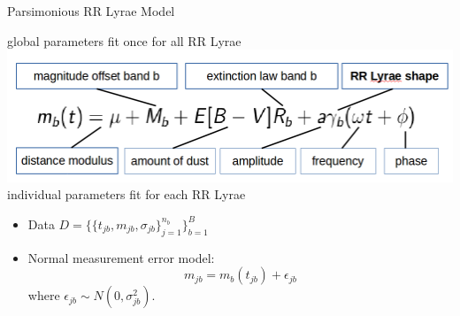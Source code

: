 \documentclass[12pt]{beamer}
\begin{document}




\begin{frame}{Parsimonious RR Lyrae Model}


\begin{center}
global parameters fit once for all RR Lyrae\\
\includegraphics[scale=.3]{figs/model.png}\\
individual parameters fit for each RR Lyrae
\end{center}

\vspace{.2in}

\begin{itemize}
\item Data $D=\{\{t_{jb},m_{jb},\sigma_{jb}\}_{j=1}^{n_b}\}_{b=1}^B$
\item Normal measurement error model:
\begin{equation*}
m_{jb} = m_b(t_{jb}) + \epsilon_{jb}
\end{equation*}
where $\epsilon_{jb} \sim N(0,\sigma_{jb}^2)$.
\end{itemize}
\end{frame}
\end{document}
